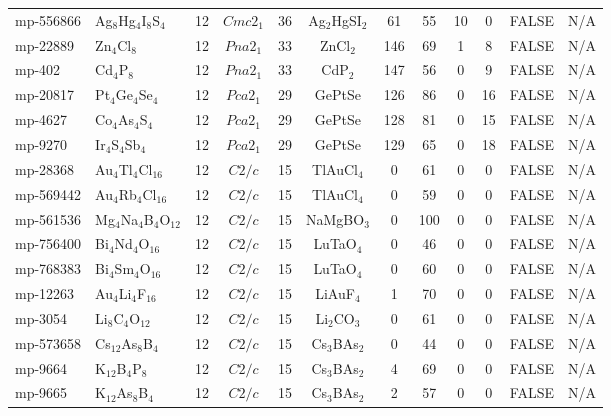 {\begin{longtable}{llcccccccccc}
    mp-556866 & Ag$_{8}$Hg$_{4}$I$_{8}$S$_{4}$ & 12    & $Cmc2_1$ & 36    & Ag$_{2}$HgSI$_{2}$ & 61    & 55    & 10    & 0     & FALSE & N/A \\
    mp-22889 & Zn$_{4}$Cl$_{8}$ & 12    & $Pna2_1$ & 33    & ZnCl$_{2}$ & 146   & 69    & 1     & 8     & FALSE & N/A \\
    mp-402 & Cd$_{4}$P$_{8}$ & 12    & $Pna2_1$ & 33    & CdP$_{2}$ & 147   & 56    & 0     & 9     & FALSE & N/A \\
    mp-20817 & Pt$_{4}$Ge$_{4}$Se$_{4}$ & 12    & $Pca2_1$ & 29    & GePtSe & 126   & 86    & 0     & 16    & FALSE & N/A \\
    mp-4627 & Co$_{4}$As$_{4}$S$_{4}$ & 12    & $Pca2_1$ & 29    & GePtSe & 128   & 81    & 0     & 15    & FALSE & N/A \\
    mp-9270 & Ir$_{4}$S$_{4}$Sb$_{4}$ & 12    & $Pca2_1$ & 29    & GePtSe & 129   & 65    & 0     & 18    & FALSE & N/A \\
    mp-28368 & Au$_{4}$Tl$_{4}$Cl$_{16}$ & 12    & $C2/c$ & 15    & TlAuCl$_{4}$ & 0     & 61    & 0     & 0     & FALSE & N/A \\
    mp-569442 & Au$_{4}$Rb$_{4}$Cl$_{16}$ & 12    & $C2/c$ & 15    & TlAuCl$_{4}$ & 0     & 59    & 0     & 0     & FALSE & N/A \\
    mp-561536 & Mg$_{4}$Na$_{4}$B$_{4}$O$_{12}$ & 12    & $C2/c$ & 15    & NaMgBO$_{3}$ & 0     & 100   & 0     & 0     & FALSE & N/A \\
    mp-756400 & Bi$_{4}$Nd$_{4}$O$_{16}$ & 12    & $C2/c$ & 15    & LuTaO$_{4}$ & 0     & 46    & 0     & 0     & FALSE & N/A \\
    mp-768383 & Bi$_{4}$Sm$_{4}$O$_{16}$ & 12    & $C2/c$ & 15    & LuTaO$_{4}$ & 0     & 60    & 0     & 0     & FALSE & N/A \\
    mp-12263 & Au$_{4}$Li$_{4}$F$_{16}$ & 12    & $C2/c$ & 15    & LiAuF$_{4}$ & 1     & 70    & 0     & 0     & FALSE & N/A \\
    mp-3054 & Li$_{8}$C$_{4}$O$_{12}$ & 12    & $C2/c$ & 15    & Li$_{2}$CO$_{3}$ & 0     & 61    & 0     & 0     & FALSE & N/A \\
    mp-573658 & Cs$_{12}$As$_{8}$B$_{4}$ & 12    & $C2/c$ & 15    & Cs$_{3}$BAs$_{2}$ & 0     & 44    & 0     & 0     & FALSE & N/A \\
    mp-9664 & K$_{12}$B$_{4}$P$_{8}$ & 12    & $C2/c$ & 15    & Cs$_{3}$BAs$_{2}$ & 4     & 69    & 0     & 0     & FALSE & N/A \\
    mp-9665 & K$_{12}$As$_{8}$B$_{4}$ & 12    & $C2/c$ & 15    & Cs$_{3}$BAs$_{2}$ & 2     & 57    & 0     & 0     & FALSE & N/A \\

\end{longtable}}
